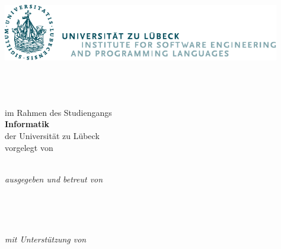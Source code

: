 %


\begin{titlepage}
    \tgherosfont
    \includegraphics[height=2.5cm]{gfx/isp-logo-english}\\
    \vfill


    {\centering
      {\LARGE \color{ctcolortitle}\textbf{\thesisTitle} \\[10mm]}
      {\large \thesisTitleGerman} \\
    }
    \vfill
    {\large \textbf{\thesisSubject}} \\[4mm]
    im Rahmen des Studiengangs\\
    {\large \textbf{Informatik}}\\
    der Universität zu Lübeck\\[7mm]
    vorgelegt von\\
    {\large \textbf{\thesisName}} \\

    \vfill
    \begin{minipage}[t]{.27\textwidth}
        \raggedleft
        \textit{ausgegeben und betreut von}
    \end{minipage}
    \hspace*{15pt}
    \begin{minipage}[t]{.65\textwidth}
        {\Large \thesisFirstReviewer} \\
    \end{minipage} \\[5mm]
    \begin{minipage}[t]{.27\textwidth}
        \raggedleft
        \textit{mit Unterstützung von}
    \end{minipage}
    \hspace*{15pt}
    \begin{minipage}[t]{.65\textwidth}
        {\Large \thesisFirstSupervisor} \\
      \end{minipage} \\[15mm]


\end{titlepage}
